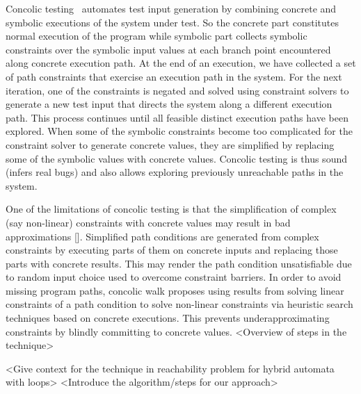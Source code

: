 Concolic testing~\cite{SEN07} automates test input generation by combining concrete and symbolic executions of the system under test. So the concrete part constitutes normal execution of the program while symbolic part collects symbolic constraints over the symbolic input values at each branch point encountered along concrete execution path. At the end of an execution, we have collected a set of path constraints that exercise an execution path in the system. For the next iteration, one of the constraints is negated and solved using constraint solvers to generate a new test input that directs the system along a different execution path. This process continues until all feasible distinct execution paths have been explored. When some of the symbolic constraints become too complicated for the constraint solver to generate concrete values, they are simplified by replacing some of the symbolic values with concrete values.
Concolic testing is thus sound (infers real bugs) and also allows exploring previously unreachable paths in the system. 

One of the limitations of concolic testing is that the simplification of complex (say non-linear) constraints with concrete values may result in bad approximations []. Simplified path conditions are generated from complex constraints by executing parts of them on concrete inputs and replacing those parts with concrete results. This may render the path condition unsatisfiable due to random input choice used to overcome constraint barriers. In order to avoid missing program paths, concolic walk proposes using results from solving linear constraints of a path condition to solve non-linear constraints via heuristic search techniques based on concrete executions. This prevents underapproximating constraints by blindly committing to concrete values. <Overview of steps in the technique>

<Give context for the technique in reachability problem for hybrid automata with loops>  
<Introduce the algorithm/steps for our approach>
